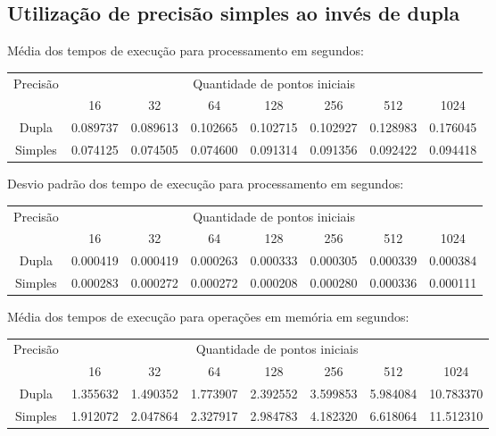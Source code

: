   \subsection{Utilização de precisão simples ao invés de dupla}
  \begin{small}
  Média dos tempos de execução para processamento em segundos:\\
  \begin{tabular}{| c | c | c | c | c | c | c | c |}
    \hline
    \multirow{2}{*}{Precisão}& \multicolumn{7}{|c|}{Quantidade de pontos iniciais} \\ \cline{2-8}
    & 16 & 32 & 64 & 128 & 256 & 512 & 1024 \\ \hline
    Dupla & 0.089737 & 0.089613 & 0.102665 & 0.102715 & 0.102927 & 0.128983 & 0.176045\\ \hline
    Simples & 0.074125 & 0.074505 & 0.074600 & 0.091314 & 0.091356 & 0.092422 & 0.094418\\ \hline

    \hline
  \end{tabular}
  \end{small}  
  \hspace{1mm}\newline
  
  \newpage
  \begin{small}
  \noindent Desvio padrão dos tempo de execução para processamento em segundos:\\
  \begin{tabular}{| c | c | c | c | c | c | c | c |}
    \hline
    \multirow{2}{*}{Precisão}& \multicolumn{7}{|c|}{Quantidade de pontos iniciais} \\ \cline{2-8}
    & 16 & 32 & 64 & 128 & 256 & 512 & 1024\\ \hline
    Dupla & 0.000419 & 0.000419 & 0.000263 & 0.000333 & 0.000305 & 0.000339 & 0.000384\\ \hline
    Simples & 0.000283 & 0.000272 & 0.000272 & 0.000208 & 0.000280 & 0.000336 & 0.000111\\ \hline

    \hline
  \end{tabular}
  \end{small}
  
  \hspace{1mm}\newline
  
  \begin{small}
  \noindent Média dos tempos de execução para operações em memória em segundos:\\
  \begin{tabular}{| c | c | c | c | c | c | c | c |}
    \hline
    \multirow{2}{*}{Precisão}& \multicolumn{7}{|c|}{Quantidade de pontos iniciais} \\ \cline{2-8}
    & 16 & 32 & 64 & 128 & 256 & 512 & 1024 \\ \hline
    Dupla & 1.355632 & 1.490352 & 1.773907 & 2.392552 & 3.599853 & 5.984084 & 10.783370\\ \hline
    Simples & 1.912072 & 2.047864 & 2.327917 & 2.984783 & 4.182320 & 6.618064 & 11.512310 \\ \hline
  \end{tabular}
  \end{small}
  
